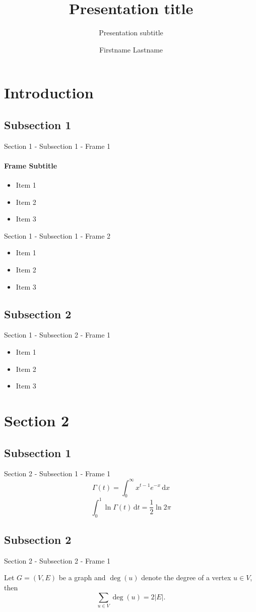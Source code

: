 \documentclass[compress,t]{beamer}
\title{Presentation title}
\subtitle{Presentation subtitle}
\author{Firstname Lastname}
\institute{Faculty, centre or unit}
\begin{document}
  \begin{frame}[plain,b]
    \titlepage
  \end{frame}

  \section{Introduction}
  \subsection{Subsection 1}
  \begin{frame}{Section 1 - Subsection 1 - Frame 1}
    \framesubtitle{Frame Subtitle}
    \begin{itemize}
      \item Item 1
      \item Item 2
      \item Item 3
    \end{itemize}
  \end{frame}
  \begin{frame}{Section 1 - Subsection 1 - Frame 2}
    \begin{itemize}
      \item Item 1
      \item Item 2
      \item Item 3
    \end{itemize}
  \end{frame}
  \subsection{Subsection 2}
  \begin{frame}{Section 1 - Subsection 2 - Frame 1}
    \begin{itemize}
      \item Item 1
      \item Item 2
      \item Item 3
    \end{itemize}
  \end{frame}

  \section{Section 2}
  \subsection{Subsection 1}
  \begin{frame}{Section 2 - Subsection 1 - Frame 1}
    $$\Gamma(t) = \int_0^\infty x^{t-1} e^{-x}\, \mathrm{d} x$$
    $$\int_0^1 \ln \Gamma(t)\, \mathrm{d} t = \frac{1}{2}\ln 2\pi$$
  \end{frame}
  \subsection{Subsection 2}
  \begin{frame}{Section 2 - Subsection 2 - Frame 1}
    \begin{theorem}
      Let $G = (V,E)$ be a graph and $\deg(u)$ denote the degree of a vertex $u \in V$, then $$\sum_{u \in V} \deg(u) = 2 \vert E \vert.$$
    \end{theorem}
  \end{frame}
\end{document}
